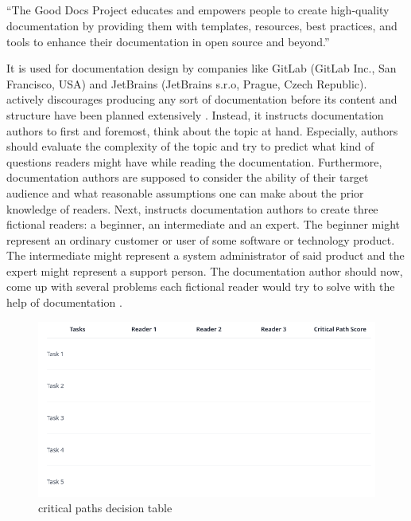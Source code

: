 \subsection{\good}\label{s:b-gooddocs}
\begin{displayquote}
	``The Good Docs Project educates and empowers people to create high-quality documentation by providing them with templates, resources, best practices, and tools to enhance their documentation in open source and beyond.''
\end{displayquote}
It is used for documentation design by companies like GitLab (GitLab Inc., San Francisco, USA) and JetBrains (JetBrains s.r.o, Prague, Czech Republic).
\good\space actively discourages producing any sort of documentation before its content and structure have been planned extensively \cite{shorterGoodDocsProject2024}.
Instead, it instructs documentation authors to first and foremost, think about the topic at hand.
Especially, authors should evaluate the complexity of the topic and try to predict what kind of questions readers might have while reading the documentation.
Furthermore, documentation authors are supposed to consider the ability of their target audience and what reasonable assumptions one can make about the prior knowledge of
readers.
Next, \good\space instructs documentation authors to create three fictional readers: a beginner, an intermediate and an expert.
The beginner might represent an ordinary customer or user of some software or technology product.
The intermediate might represent a system administrator of said product
and the expert might represent a support person.
The documentation author should now, come up with several problems each fictional reader would try to solve with the help of documentation \cite{shorterGoodDocsProject2024}.
\begin{figure}[h]
	\centerline{
		\includegraphics[scale=0.5]{images/gd_dt.png}}
	\caption{\good\space critical paths decision table \cite{shorterGoodDocsProject2024}}\label{fig:dg-dt}
\end{figure}

